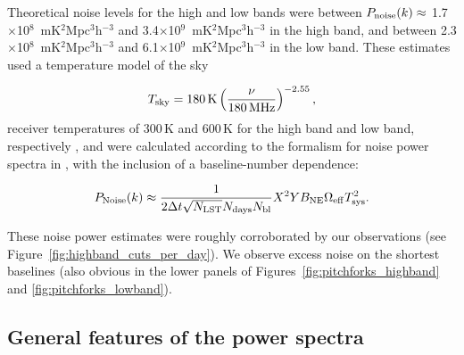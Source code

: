 \documentclass[twocolumn, trackchanges]{aastex61}
\begin{document}
Theoretical noise levels for the high and low bands were between 
$P_{\rm noise}(k)\approx$ 1.7$\times$10$^8$ \,mK$^2$Mpc$^3$h$^{-3}$ and 3.4$\times$10$^9$ \,mK$^2$Mpc$^3$h$^{-3}$ in the high band, and between 2.3$\times$10$^8$ \,mK$^2$Mpc$^3$h$^{-3}$ and 6.1$\times$10$^9$ \,mK$^2$Mpc$^3$h$^{-3}$ in the low band. These estimates used a temperature model of the sky

\begin{equation}
T_{\rm sky} = 180\,{\rm K} \left(\frac{\nu}{180\,{\rm MHz}}\right)^{-2.55},
\end{equation}
 receiver temperatures of 300\,K and 600\,K for the high band and low band, respectively \citep[][also see the public \href{http://reionization.org/wp-content/uploads/2017/04/HERA19_Tsys_3April2017.pdf}{}]{deBoer17}, and were calculated according to the formalism for noise power spectra in \cite{Parsons.12a}, with the inclusion of a baseline-number dependence:

\begin{equation}
P_{\rm Noise}(k) \approx \frac{1}{2\Delta t \sqrt{N_{\rm LST}} N_{\rm days} N_{\rm bl}} X^2 Y B_{\rm NE} \Omega_{\rm eff} T_{\rm sys}^2.
\end{equation}


These noise power estimates were roughly corroborated by our observations (see Figure~\ref{fig:highband_cuts_per_day}). We observe excess noise on the shortest baselines (also obvious in the lower panels of Figures~\ref{fig:pitchforks_highband} and \ref{fig:pitchforks_lowband}). 

\subsection{General features of the power spectra}
\label{subsec:general_features}
\end{document}
